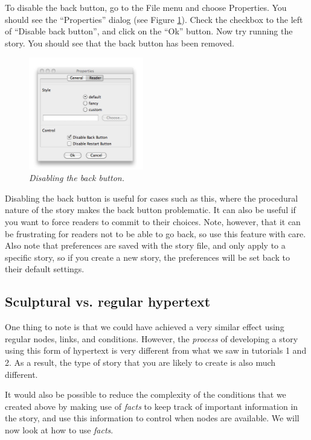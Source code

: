 \documentclass{article}
\begin{document}
To disable the back button, go to the File menu and choose Properties. You should
see the ``Properties'' dialog (see Figure \ref{fig:tut3:preferences}). Check the
checkbox to the left of ``Disable back button'', and click on the ``Ok'' button.
Now try running the story. You should see that the back button has been removed.

\begin{figure}[h]
  \centering
  \includegraphics[width=5cm]{images/hypedyn-tutorial-3-figure-8}
  \caption{\textit{Disabling the back button.}}
  \label{fig:tut3:preferences}
\end{figure} 

Disabling the back button is useful for cases such as this, where the procedural
nature of the story makes the back button problematic. It can also be useful if
you want to force readers to commit to their choices. Note, however, that it can
be frustrating for readers not to be able to go back, so use this feature with
care. Also note that preferences are saved with the story file, and only apply to
a specific story, so if you create a new story, the preferences will be set back
to their default settings.

\subsection{Sculptural vs. regular hypertext}

One thing to note is that we could have achieved a very similar effect using
regular nodes, links, and conditions. However, the \textit{process} of
developing a story using this form of hypertext is very different from what we
saw in tutorials 1 and 2. As a result, the type of story that you are likely to
create is also much different.

It would also be possible to reduce the complexity of the conditions that we
created above by making use of \textit{facts} to keep track of important
information in the story, and use this information to control when nodes are
available. We will now look at how to use \textit{facts}.
\end{document}
